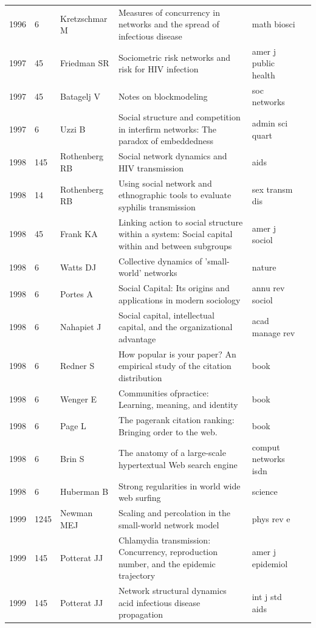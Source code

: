 \documentclass[11pt]{article} %
\begin{document}
\begin{landscape}
\begin{longtable}{p{0.7cm}|p{0.8cm}|p{3cm}|p{14.5cm}|p{3.5cm}l}
1996& 	6& 	 Kretzschmar M& 	 Measures of concurrency in networks and the spread of infectious disease& 	 math biosci\\
1997& 	45& 	 Friedman SR& 	 Sociometric risk networks and risk for HIV infection& 	 amer j public health\\
1997& 	45& 	 Batagelj V& 	 Notes on blockmodeling& 	 soc networks\\
1997& 	6& 	 Uzzi B& 	 Social structure and competition in interfirm networks: The paradox of embeddedness& 	 admin sci quart\\
1998& 	145& 	 Rothenberg RB& 	 Social network dynamics and HIV transmission& 	 aids\\
1998& 	14& 	 Rothenberg RB& 	 Using social network and ethnographic tools to evaluate syphilis transmission& 	 sex transm dis\\
1998& 	45& 	 Frank KA& 	 Linking action to social structure within a system: Social capital within and between subgroups& 	 amer j sociol\\
1998& 	6& 	 Watts DJ& 	 Collective dynamics of 'small-world' networks& 	 nature\\
1998& 	6& 	 Portes A& 	 Social Capital: Its origins and applications in modern sociology& 	 annu rev sociol\\
1998& 	6& 	 Nahapiet J& 	 Social capital, intellectual capital, and the organizational advantage& 	 acad manage rev\\
1998& 	6& 	 Redner S& 	 How popular is your paper? An empirical study of the citation distribution& 	 book\\
1998& 	6& 	 Wenger E& 	 Communities ofpractice: Learning, meaning, and identity& 	 book\\
1998& 	6& 	 Page L & 	 The pagerank citation ranking: Bringing order to the web.& 	 book\\
1998& 	6& 	 Brin S& 	 The anatomy of a large-scale hypertextual Web search engine& 	 comput networks isdn\\
1998& 	6& 	 Huberman B& 	 Strong regularities in world wide web surfing& 	 science \\
1999& 	1245& 	 Newman MEJ& 	 Scaling and percolation in the small-world network model& 	 phys rev e\\
1999& 	145& 	 Potterat JJ& 	 Chlamydia transmission: Concurrency, reproduction number, and the epidemic trajectory& 	 amer j epidemiol\\
1999& 	145& 	 Potterat JJ& 	 Network structural dynamics acid infectious disease propagation& 	 int j std aids\\

\end{longtable}
\end{landscape}
\end{document}
